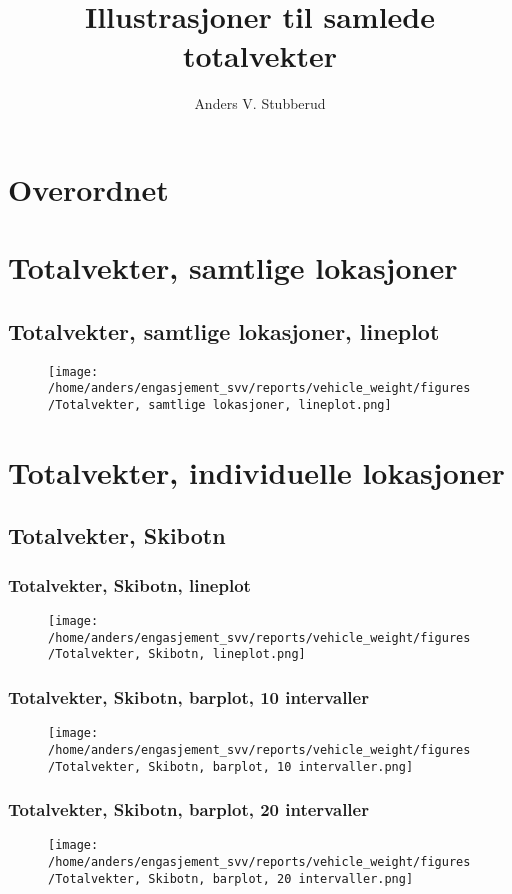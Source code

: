 \documentclass{article}
\begin{document}
\title{Illustrasjoner til samlede totalvekter}
\author{Anders V. Stubberud}
\maketitle
\tableofcontents
\newpage
\section{Overordnet}

\section{Totalvekter, samtlige lokasjoner}
\subsection{Totalvekter, samtlige lokasjoner, lineplot}
\begin{figure}[H]
\centering
\texttt{[image: /home/anders/engasjement\_svv/reports/vehicle\_weight/figures/Totalvekter, samtlige lokasjoner, lineplot.png]}
\end{figure}
\section{Totalvekter, individuelle lokasjoner}
\subsection{Totalvekter, Skibotn}
\subsubsection{Totalvekter, Skibotn, lineplot}
\begin{figure}[H]
\centering
\texttt{[image: /home/anders/engasjement\_svv/reports/vehicle\_weight/figures/Totalvekter, Skibotn, lineplot.png]}
\end{figure}
\subsubsection{Totalvekter, Skibotn, barplot, 10 intervaller}
\begin{figure}[H]
\centering
\texttt{[image: /home/anders/engasjement\_svv/reports/vehicle\_weight/figures/Totalvekter, Skibotn, barplot, 10 intervaller.png]}
\end{figure}
\subsubsection{Totalvekter, Skibotn, barplot, 20 intervaller}
\begin{figure}[H]
\centering
\texttt{[image: /home/anders/engasjement\_svv/reports/vehicle\_weight/figures/Totalvekter, Skibotn, barplot, 20 intervaller.png]}
\end{figure}
\end{document}
